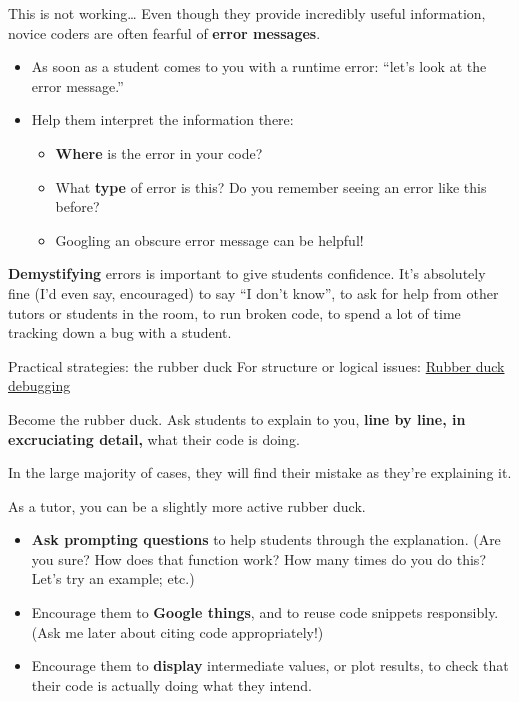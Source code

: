 \documentclass[10pt]{beamer}
\begin{document}
\begin{frame}{This is not working\ldots}
    Even though they provide incredibly useful information, novice coders are often fearful of \textbf{error messages}.

    \begin{itemize}[<+->]
        \item As soon as a student comes to you with a runtime error: ``let's look at the error message.''
        \item Help them interpret the information there:
            \begin{itemize}
                \item \textbf{Where} is the error in your code?
                \item What \textbf{type} of error is this? Do you remember seeing an error like this before?
                \item Googling an obscure error message can be helpful!
            \end{itemize}
    \end{itemize}

    \pause
    \textbf{Demystifying} errors is important to give students confidence. It's absolutely fine (I'd even say, encouraged) to say ``I don't know'', to ask for help from other tutors or students in the room, to run broken code, to spend a lot of time tracking down a bug with a student.
\end{frame}

\begin{frame}{Practical strategies: the rubber duck}
    For structure or logical issues: \href{https://rubberduckdebugging.com/}{\alert{Rubber duck debugging}}
    \pause

    \begin{exampleblock}{Become the rubber duck.}
        Ask students to explain to you, \textbf{line by line, in excruciating detail,} what their code is doing.

        In the large majority of cases, they will find their mistake as they're explaining it.
    \end{exampleblock}

    \pause
    As a tutor, you can be a slightly more active rubber duck.
    \begin{itemize}[<+->]
        \item \textbf{Ask prompting questions} to help students through the explanation. (Are you sure? How does that function work? How many times do you do this? Let's try an example; etc.)
        \item Encourage them to \textbf{Google things}, and to reuse code snippets responsibly. (Ask me later about citing code appropriately!)
        \item Encourage them to \textbf{display} intermediate values, or plot results, to check that their code is actually doing what they intend.
    \end{itemize}
\end{frame}
\end{document}
